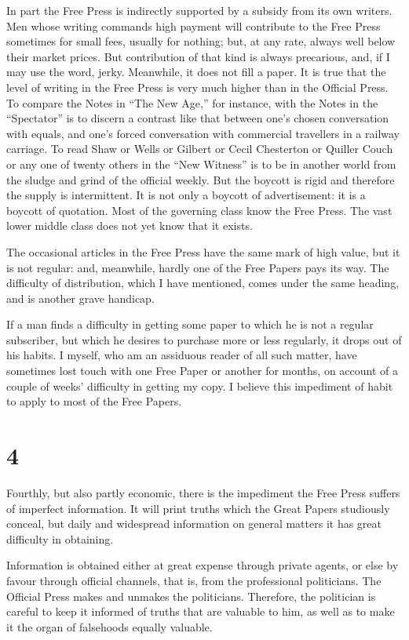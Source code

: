 \documentclass{book}
\begin{document}
In part the Free Press is indirectly supported by a subsidy from its own writers. Men whose writing commands high payment will contribute to the Free Press sometimes for small fees, usually for nothing; but, at any rate, always well below their market prices. But contribution of that kind is always precarious, and, if I may use the word, jerky. Meanwhile, it does not fill a paper. It is true that the level of writing in the Free Press is very much higher than in the Official Press. To compare the Notes in “The New Age,” for instance, with the Notes in the “Spectator” is to discern a contrast like that between one’s chosen conversation with equals, and one’s forced conversation with commercial travellers in a railway carriage. To read Shaw or Wells or Gilbert or Cecil Chesterton or Quiller Couch or any one of twenty others in the “New Witness” is to be in another world from the sludge and grind of the official weekly. But the boycott is rigid and therefore the supply is intermittent. It is not only a boycott of advertisement: it is a boycott of quotation. Most of the governing class know the Free Press. The vast lower middle class does not yet know that it exists.

The occasional articles in the Free Press have the same mark of high value, but it is not regular: and, meanwhile, hardly one of the Free Papers pays its way. The difficulty of distribution, which I have mentioned, comes under the same heading, and is another grave handicap.

If a man finds a difficulty in getting some paper to which he is not a regular subscriber, but which he desires to purchase more or less regularly, it drops out of his habits. I myself, who am an assiduous reader of all such matter, have sometimes lost touch with one Free Paper or another for months, on account of a couple of weeks’ difficulty in getting my copy. I believe this impediment of habit to apply to most of the Free Papers.

\section*{4}
Fourthly, but also partly economic, there is the impediment the Free Press suffers of imperfect information. It will print truths which the Great Papers studiously conceal, but daily and widespread information on general matters it has great difficulty in obtaining.

Information is obtained either at great expense through private agents, or else by favour through official channels, that is, from the professional politicians. The Official Press makes and unmakes the politicians. Therefore, the politician is careful to keep it informed of truths that are valuable to him, as well as to make it the organ of falsehoods equally valuable.
\end{document}
